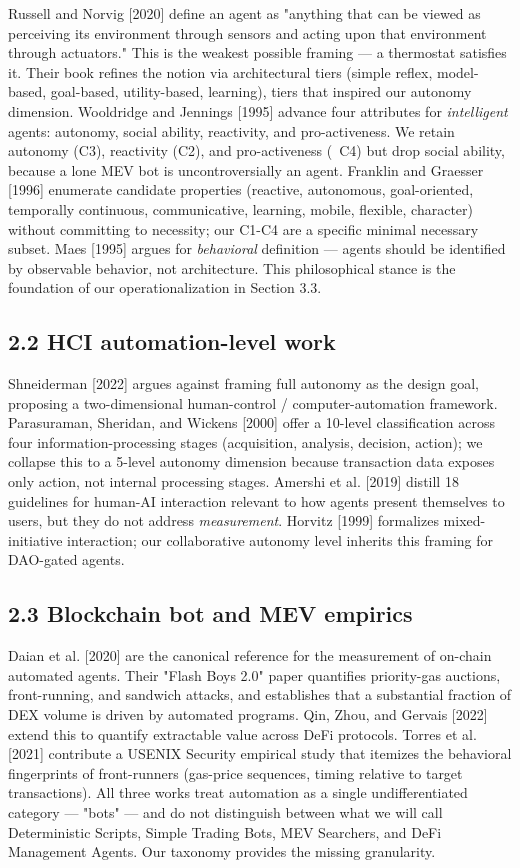 \documentclass[sigconf,nonacm=false]{acmart}
\begin{document}
Russell and Norvig [2020] define an agent as "anything that can be viewed as perceiving its environment through sensors and acting upon that environment through actuators." This is the weakest possible framing --- a thermostat satisfies it. Their book refines the notion via architectural tiers (simple reflex, model-based, goal-based, utility-based, learning), tiers that inspired our autonomy dimension. Wooldridge and Jennings [1995] advance four attributes for \textit{intelligent} agents: autonomy, social ability, reactivity, and pro-activeness. We retain autonomy (C3), reactivity (C2), and pro-activeness (~C4) but drop social ability, because a lone MEV bot is uncontroversially an agent. Franklin and Graesser [1996] enumerate candidate properties (reactive, autonomous, goal-oriented, temporally continuous, communicative, learning, mobile, flexible, character) without committing to necessity; our C1-C4 are a specific minimal necessary subset. Maes [1995] argues for \textit{behavioral} definition --- agents should be identified by observable behavior, not architecture. This philosophical stance is the foundation of our operationalization in Section 3.3.

\subsection{2.2 HCI automation-level work}

Shneiderman [2022] argues against framing full autonomy as the design goal, proposing a two-dimensional human-control / computer-automation framework. Parasuraman, Sheridan, and Wickens [2000] offer a 10-level classification across four information-processing stages (acquisition, analysis, decision, action); we collapse this to a 5-level autonomy dimension because transaction data exposes only action, not internal processing stages. Amershi et al. [2019] distill 18 guidelines for human-AI interaction relevant to how agents present themselves to users, but they do not address \textit{measurement}. Horvitz [1999] formalizes mixed-initiative interaction; our collaborative autonomy level inherits this framing for DAO-gated agents.

\subsection{2.3 Blockchain bot and MEV empirics}

Daian et al. [2020] are the canonical reference for the measurement of on-chain automated agents. Their "Flash Boys 2.0" paper quantifies priority-gas auctions, front-running, and sandwich attacks, and establishes that a substantial fraction of DEX volume is driven by automated programs. Qin, Zhou, and Gervais [2022] extend this to quantify extractable value across DeFi protocols. Torres et al. [2021] contribute a USENIX Security empirical study that itemizes the behavioral fingerprints of front-runners (gas-price sequences, timing relative to target transactions). All three works treat automation as a single undifferentiated category --- "bots" --- and do not distinguish between what we will call Deterministic Scripts, Simple Trading Bots, MEV Searchers, and DeFi Management Agents. Our taxonomy provides the missing granularity.
\end{document}
